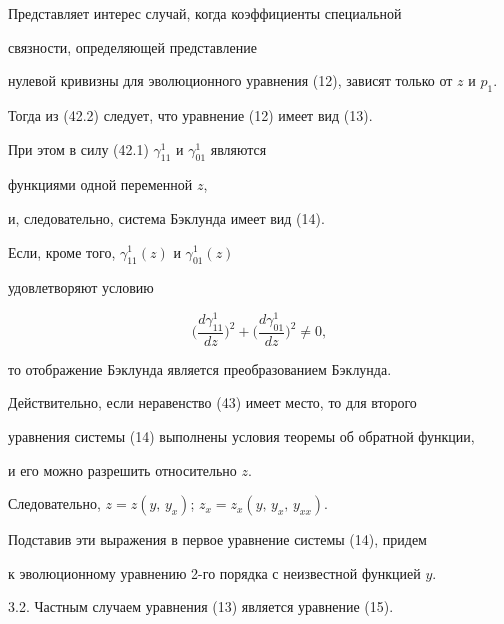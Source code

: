 \begin{notes}


Представляет интерес случай, когда коэффициенты специальной 


связности, определяющей представление


нулевой кривизны для эволюционного уравнения (12), зависят только от $z$ и $p_1$.


Тогда из (42.2) следует, что уравнение {(12)} имеет вид (13).





При этом в силу {(42.1)} $\gamma_{11}^1$ и $\gamma_{01}^1$ являются 


функциями одной переменной $z$,


и, следовательно, система Бэклунда имеет вид (14).





Если, кроме того, $\gamma_{11}^1(z)$ и $\gamma_{01}^1 (z)$ 


удовлетворяют условию


\begin{equation}


\bigg({\frac{{d\gamma_{11}^1}}{{dz}}}\bigg)^2+


\bigg({\frac{{d\gamma_{01}^1}}{{dz}}}\bigg)^2 \ne 0,


\end{equation}


то отображение Бэклунда является преобразованием Бэклунда.


\end{notes}





Действительно, если неравенство (43) имеет место, то для второго 


уравнения системы (14) выполнены условия теоремы об обратной функции, 


и его можно разрешить относительно $z$.


Следовательно, $z=z ({y,\,y_x})$; $z_x=z_x ({y,\,y_x,\,y_{xx}})$.


Подставив эти выражения в первое уравнение системы (14), придем 


к эволюционному уравнению 2-го порядка с неизвестной функцией $y$.


\medskip





3.2. Частным случаем уравнения (13) является уравнение (15).








